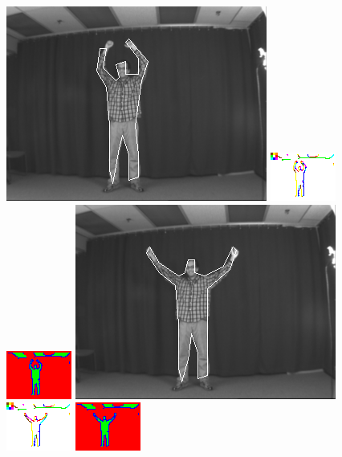 \documentclass{tufte-book}
\begin{document}
\begin{figure}
\includegraphics[width=0.3 \linewidth]{output/2.detection/image_parsing/out.10.d/thefinalparse.png}
\includegraphics[width=0.3 \linewidth]{output/2.detection/image_parsing/out.10.d/local.x5.orientations.png}
\includegraphics[width=0.3 \linewidth]{output/2.detection/image_parsing/out.10.d/local.x5.interior.png}
\includegraphics[width=0.3 \linewidth]{output/2.detection/image_parsing/out.11.d/thefinalparse.png}
\includegraphics[width=0.3 \linewidth]{output/2.detection/image_parsing/out.11.d/local.x5.orientations.png}
\includegraphics[width=0.3 \linewidth]{output/2.detection/image_parsing/out.11.d/local.x5.interior.png}

\end{figure}
\end{document}
